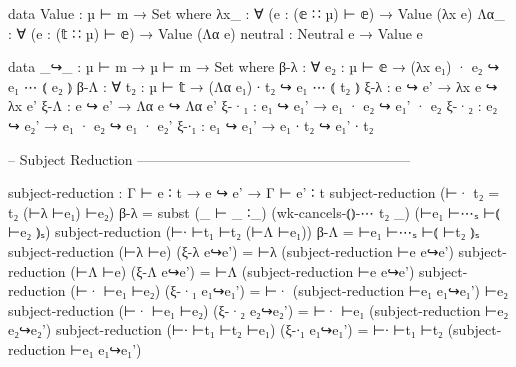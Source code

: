 \begin{code}
  data Value : µ ⊢ m → Set where
    λx_     : ∀ (e : (𝕖 ∷ µ) ⊢ 𝕖) → Value (λx e)
    Λα_     : ∀ (e : (𝕥 ∷ µ) ⊢ 𝕖) → Value (Λα e)
    neutral : Neutral e → Value e

data _↪_ : µ ⊢ m → µ ⊢ m → Set where
  β-λ : ∀ {e₂ : µ ⊢ 𝕖} →
    (λx e₁) · e₂ ↪ e₁ ⋯ ⦅ e₂ ⦆
  β-Λ : ∀ {t₂ : µ ⊢ 𝕥} →
    (Λα e₁) ∙ t₂ ↪ e₁ ⋯ ⦅ t₂ ⦆
  ξ-λ :
    e ↪ e' →
    λx e ↪ λx e'
  ξ-Λ :
    e ↪ e' →
    Λα e ↪ Λα e'
  ξ-·₁ :
    e₁ ↪ e₁' →
    e₁ · e₂ ↪ e₁' · e₂
  ξ-·₂ :
    e₂ ↪ e₂' →
    e₁ · e₂ ↪ e₁ · e₂'
  ξ-∙₁ :
    e₁ ↪ e₁' →
    e₁ ∙ t₂ ↪ e₁' ∙ t₂

-- Subject Reduction -----------------------------------------------------------

subject-reduction :
  Γ ⊢ e ∶ t →
  e ↪ e' →
  Γ ⊢ e' ∶ t
subject-reduction (⊢· {t₂ = t₂} (⊢λ ⊢e₁) ⊢e₂)   β-λ          = subst (_ ⊢ _ ∶_) (wk-cancels-⦅⦆-⋯ t₂ _) (⊢e₁ ⊢⋯ₛ ⊢⦅ ⊢e₂ ⦆ₛ)
subject-reduction (⊢∙ ⊢t₁ ⊢t₂ (⊢Λ ⊢e₁))         β-Λ          = ⊢e₁ ⊢⋯ₛ ⊢⦅ ⊢t₂ ⦆ₛ
subject-reduction (⊢λ ⊢e)                      (ξ-λ e↪e')    = ⊢λ (subject-reduction ⊢e e↪e')
subject-reduction (⊢Λ ⊢e)                      (ξ-Λ e↪e')    = ⊢Λ (subject-reduction ⊢e e↪e')
subject-reduction (⊢· ⊢e₁ ⊢e₂)                 (ξ-·₁ e₁↪e₁') = ⊢· (subject-reduction ⊢e₁ e₁↪e₁') ⊢e₂
subject-reduction (⊢· ⊢e₁ ⊢e₂)                 (ξ-·₂ e₂↪e₂') = ⊢· ⊢e₁ (subject-reduction ⊢e₂ e₂↪e₂')
subject-reduction (⊢∙ ⊢t₁ ⊢t₂ ⊢e₁)             (ξ-∙₁ e₁↪e₁') = ⊢∙ ⊢t₁ ⊢t₂ (subject-reduction ⊢e₁ e₁↪e₁')

\end{code}
